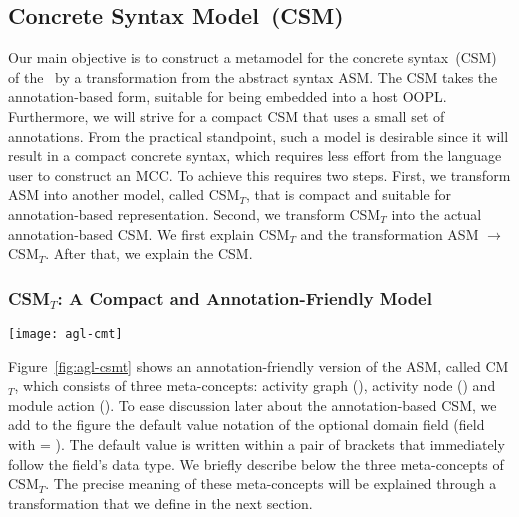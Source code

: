 \subsection{Concrete Syntax Model~(CSM)} \label{sect:agl-asm}

Our main objective is to construct a metamodel for the concrete syntax~(CSM) of the \agl~by a transformation from the abstract syntax ASM. The CSM takes the annotation-based form, suitable for being embedded into a host OOPL. Furthermore, we will strive for a compact CSM that uses a small set of annotations. From the practical standpoint, such a model is desirable since it will result in a compact concrete syntax, which requires less effort from the language user to construct an MCC. To achieve this requires two steps. First, we transform ASM into another model, called CSM$_T$, that is compact and suitable for annotation-based representation. Second, we transform CSM$_T$ into the actual annotation-based CSM.
%
We first explain CSM$_T$ and the transformation ASM $\rightarrow$ CSM$_T$. After that, we explain the CSM.

\subsubsection{CSM$_T$: A Compact and Annotation-Friendly Model}

\begin{figure*}[ht]
	\begin{center}
		\texttt{[image: agl-cmt]}
	\end{center}
	\caption{CSM$_T$: a compact and annotation-friendly model.} %
	\label{fig:agl-csmt}
\end{figure*}

%
Figure~\ref{fig:agl-csmt} shows an annotation-friendly version of the ASM, called CM$_T$, which consists of three meta-concepts: activity graph (), activity node () and module action (). To ease discussion later about the annotation-based CSM, we add to the figure the default value notation of the optional domain field (\ie field with  = ). The default value is written within a pair of brackets that immediately follow the field's data type.
We briefly describe below the three meta-concepts of CSM$_T$. The precise meaning of these meta-concepts will be explained through a transformation that we define in the next section. 

